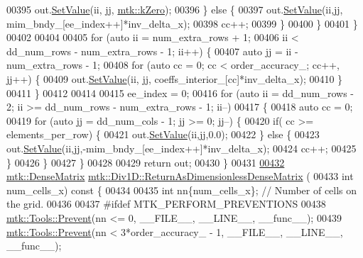 \begin{DoxyCode}
{{00395         out.\hyperlink{classmtk_1_1DenseMatrix_a784ce5784109ac86bfb9d8562b334b13}{SetValue}(ii, jj, \hyperlink{group__c01-roots_ga59a451a5fae30d59649bcda274fea271}{mtk::kZero});
00396       \} \textcolor{keywordflow}{else} \{
00397         out.\hyperlink{classmtk_1_1DenseMatrix_a784ce5784109ac86bfb9d8562b334b13}{SetValue}(ii,jj, mim\_bndy\_[ee\_index++]*inv\_delta\_x);
00398         cc++;
00399       \}
00400     \}
00401   \}
00402 
00404 
00405   \textcolor{keywordflow}{for} (\textcolor{keyword}{auto} ii = num\_extra\_rows + 1;
00406        ii < dd\_num\_rows - num\_extra\_rows - 1; ii++) \{
00407     \textcolor{keyword}{auto} jj = ii - num\_extra\_rows - 1;
00408     \textcolor{keywordflow}{for} (\textcolor{keyword}{auto} cc = 0; cc < order\_accuracy\_; cc++, jj++) \{
00409       out.\hyperlink{classmtk_1_1DenseMatrix_a784ce5784109ac86bfb9d8562b334b13}{SetValue}(ii, jj, coeffs\_interior\_[cc]*inv\_delta\_x);
00410     \}
00411   \}
00412 
00414 
00415   ee\_index = 0;
00416   \textcolor{keywordflow}{for} (\textcolor{keyword}{auto} ii = dd\_num\_rows - 2; ii >= dd\_num\_rows - num\_extra\_rows - 1; ii--)
00417 \{
00418     \textcolor{keyword}{auto} cc = 0;
00419     \textcolor{keywordflow}{for} (\textcolor{keyword}{auto} jj = dd\_num\_cols - 1; jj >= 0; jj--) \{
00420       \textcolor{keywordflow}{if}( cc >= elements\_per\_row) \{
00421         out.\hyperlink{classmtk_1_1DenseMatrix_a784ce5784109ac86bfb9d8562b334b13}{SetValue}(ii,jj,0.0);
00422       \} \textcolor{keywordflow}{else} \{
00423         out.\hyperlink{classmtk_1_1DenseMatrix_a784ce5784109ac86bfb9d8562b334b13}{SetValue}(ii,jj,-mim\_bndy\_[ee\_index++]*inv\_delta\_x);
00424         cc++;
00425       \}
00426      \}
00427   \}
00428 
00429   \textcolor{keywordflow}{return} out;
00430 \}
00431 
\hypertarget{mtk__div__1d_8cc_source_l00432}{}\hyperlink{classmtk_1_1Div1D_af2546ad1568ef39a6075f03bb395719e}{00432} \hyperlink{classmtk_1_1DenseMatrix}{mtk::DenseMatrix} \hyperlink{classmtk_1_1Div1D_af2546ad1568ef39a6075f03bb395719e}{mtk::Div1D::ReturnAsDimensionlessDenseMatrix}
      (
00433   \textcolor{keywordtype}{int} num\_cells\_x)\textcolor{keyword}{ const }\{
00434 
00435   \textcolor{keywordtype}{int} nn\{num\_cells\_x\}; \textcolor{comment}{// Number of cells on the grid.}
00436 
00437 \textcolor{preprocessor}{  #ifdef MTK\_PERFORM\_PREVENTIONS}
00438   \hyperlink{classmtk_1_1Tools_a332324c6f25e66be9dff48c5987a3b9f}{mtk::Tools::Prevent}(nn <= 0, \_\_FILE\_\_, \_\_LINE\_\_, \_\_func\_\_);
00439   \hyperlink{classmtk_1_1Tools_a332324c6f25e66be9dff48c5987a3b9f}{mtk::Tools::Prevent}(nn < 3*order\_accuracy\_ - 1, \_\_FILE\_\_, \_\_LINE\_\_, \_\_func\_\_);
}}
\end{DoxyCode}
